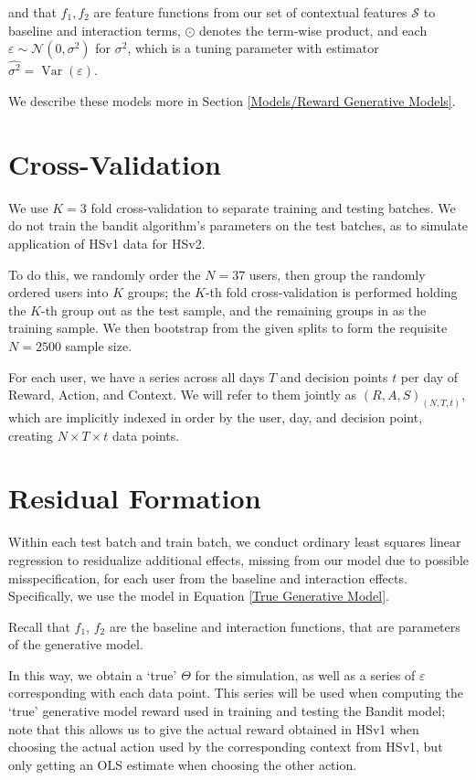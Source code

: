 and that $f_1, f_2$ are feature functions from our set of contextual features $\mathcal{S}$ to baseline and interaction terms, $\odot$ denotes the term-wise product, and each $\varepsilon \sim \mathcal{N}\left(0, \sigma^2 \right)$ for $\sigma^2$, which is a tuning parameter with estimator $\hat{\sigma^2} = \operatorname{Var}(\varepsilon)$.  

We describe these models more in Section \ref{Models/Reward Generative Models}.





\section{Cross-Validation}

We use $K = 3$ fold cross-validation to separate training and testing batches.  We do not train the bandit algorithm's parameters on the test batches, as to simulate application of HSv1 data for HSv2.  

To do this, we randomly order the $N = 37$ users, then group the randomly ordered users into $K$ groups; the $K$-th fold cross-validation is performed holding the $K$-th group out as the test sample, and the remaining groups in as the training sample.  We then bootstrap from the given splits to form the requisite $N = 2500$ sample size.

For each user, we have a series across all days $T$ and decision points $t$ per day of Reward, Action, and Context.  We will refer to them jointly as $(R, A, S)_{(N,T,t)}$, which are implicitly indexed in order by the user, day, and decision point, creating $N \times T \times t$ data points.  



\section{Residual Formation}
\label{Residual Formation}

Within each test batch and train batch, we conduct ordinary least squares linear regression to residualize additional effects, missing from our model due to possible misspecification, for each user from the baseline and interaction effects.  Specifically, we use the model in Equation \ref{True Generative Model}.

Recall that $f_1$, $f_2$ are the baseline and interaction functions, that are parameters of the generative model.

In this way, we obtain a `true' $\Theta$ for the simulation, as well as a series of $\varepsilon$ corresponding with each data point.  This series will be used when computing the `true' generative model reward used in training and testing the Bandit model; note that this allows us to give the actual reward obtained in HSv1 when choosing the actual action used by the corresponding context from HSv1, but only getting an OLS estimate when choosing the other action.


